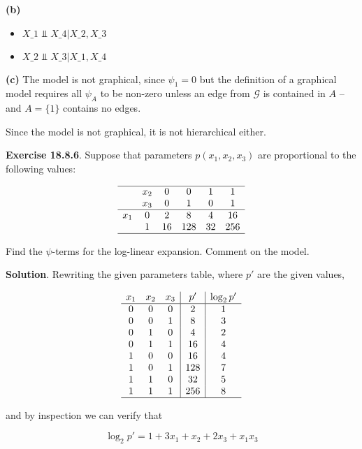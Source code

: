 \textbf{(b)}

\begin{itemize}[tightlist]
\item
  $X\_{1} \text{ ⫫ } X\_{4} |{} X\_{2}, X\_{3} $
\item
  $X\_{2} \text{ ⫫ } X\_{3} |{} X\_{1}, X\_{4} $
\end{itemize}

\textbf{(c)} The model is not graphical, since \(\psi_{1} = 0\) but the
definition of a graphical model requires all \(\psi_A\) to be non-zero
unless an edge from \(\mathcal{G}\) is contained in \(A\) -- and
\(A = \{ 1 \}\) contains no edges.

Since the model is not graphical, it is not hierarchical either.

\textbf{Exercise 18.8.6}. Suppose that parameters \(p(x_{1}, x_{2}, x_{3})\)
are proportional to the following values:

\[
\begin{array}{cccccc}
\hline
    & x_{2} & 0  & 0   & 1  & 1 \\
    & x_{3} & 0  & 1   & 0  & 1 \\
\hline
x_{1} & 0   & 2  &   8 &  4 & 16 \\
    & 1   & 16 & 128 & 32 & 256 \\
\hline
\end{array}
\]

Find the \(\psi\)-terms for the log-linear expansion. Comment on the
model.

\textbf{Solution}. Rewriting the given parameters table, where \(p'\)
are the given values,

\[
\begin{array}{ccc | c | c}
x_{1} & x_{2} & x_{3} & p'   & \log_{2} p'\\
\hline
0   &   0  &  0 & 2   & 1\\
0   &   0  &  1 & 8   & 3\\
0   &   1  &  0 & 4   & 2\\
0   &   1  &  1 & 16  & 4\\
1   &   0  &  0 & 16  & 4\\
1   &   0  &  1 & 128 & 7\\
1   &   1  &  0 & 32  & 5\\
1   &   1  &  1 & 256 & 8\\
\hline
\end{array}
\]

and by inspection we can verify that

\[ \log_{2} p' = 1 + 3 x_{1} + x_{2} + 2 x_{3} + x_{1} x_{3} \]

